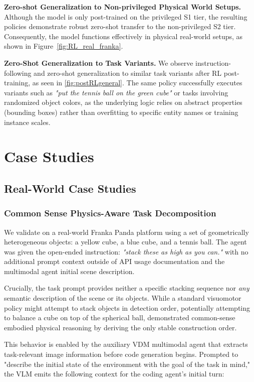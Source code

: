 \textbf{Zero-shot Generalization to Non-privileged Physical World Setups.} Although the model is only post-trained on the privileged S1 tier, the resulting policies demonstrate robust zero-shot transfer to the non-privileged S2 tier. Consequently, the model functions effectively in physical real-world setups, as shown in Figure~\ref{fig:RL_real_franka}.

\textbf{Zero-Shot Generalization to Task Variants.}
We observe instruction-following and zero-shot generalization to similar task variants after RL post-training, as seen in \ref{fig:postRLgeneral}. The same policy successfully executes variants such as \textit{"put the tennis ball on the green cube"} or tasks involving randomized object colors, as the underlying logic relies on abstract properties (bounding boxes) rather than overfitting to specific entity names or training instance scales. 

\newpage

\section{\sysname{} Case Studies}
\label{app:case_study}
\subsection{Real-World Case Studies}
\subsubsection{Common Sense Physics-Aware Task Decomposition}
\label{app:case_study_physics_reasoning}
We validate \sysname{} on a real-world Franka Panda platform using a set of geometrically heterogeneous objects: a yellow cube, a blue cube, and a tennis ball. The agent was given the open-ended instruction: \textit{"stack these as high as you can."} with no additional prompt context outside of API usage documentation and the multimodal agent initial scene description.

Crucially, the task prompt provides neither a specific stacking sequence nor \textit{any} semantic description of the scene or its objects. While a standard visuomotor policy might attempt to stack objects in detection order, potentially attempting to balance a cube on top of the spherical ball, \sysname{} demonstrated common-sense embodied physical reasoning by deriving the only stable construction order.

This behavior is enabled by the \sysname{} auxiliary VDM multimodal agent that extracts task-relevant image information before code generation begins. Prompted to "describe the initial state of the environment with the goal of the task in mind," the VLM emits the following context for the coding agent's initial turn:


